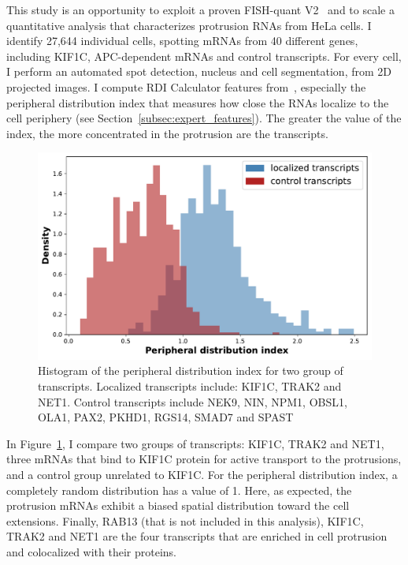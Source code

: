 This study is an opportunity to exploit a proven FISH-quant V2~\cite{Imbert_fq_2022} and to scale a quantitative analysis that characterizes protrusion \ac{RNA}s from HeLa cells.
I identify 27,644 individual cells, spotting \ac{mRNA}s from 40 different genes, including KIF1C, APC-dependent \ac{mRNA}s and control transcripts.
For every cell, I perform an automated spot detection, nucleus and cell segmentation, from 2D projected images.
I compute RDI Calculator features from~\cite{stueland_rdi_2019}, especially the peripheral distribution index that measures how close the \ac{RNA}s localize to the cell periphery (see Section~\ref{subsec:expert_features}).
The greater the value of the index, the more concentrated in the protrusion are the transcripts.

\begin{figure}[]
    \centering
    \includegraphics[width=\textwidth]{figures/chapter5/helacentrin_distribution_pdi}
    \caption[Histogram of the peripheral distribution index]{Histogram of the peripheral distribution index for two group of transcripts.
	Localized transcripts include: KIF1C, TRAK2 and NET1.
	Control transcripts include NEK9, NIN, NPM1, OBSL1, OLA1, PAX2, PKHD1, RGS14, SMAD7 and SPAST}
    \label{fig:xavier_pdi}
\end{figure}

In Figure~\ref{fig:xavier_pdi}, I compare two groups of transcripts: KIF1C, TRAK2 and NET1, three \ac{mRNA}s that bind to KIF1C protein for active transport to the protrusions, and a control group unrelated to KIF1C.
For the peripheral distribution index, a completely random distribution has a value of 1.
Here, as expected, the protrusion \ac{mRNA}s exhibit a biased spatial distribution toward the cell extensions.
Finally, RAB13 (that is not included in this analysis), KIF1C, TRAK2 and NET1 are the four transcripts that are enriched in cell protrusion and colocalized with their proteins.

